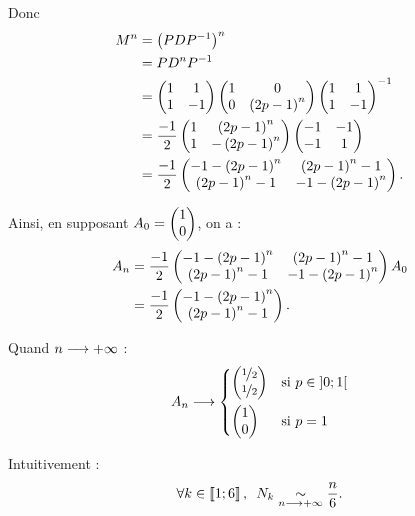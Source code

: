 \begin{corr}[Exercice 1, 2]
Donc \[\begin{aligned}
M^n&=\left(PDP^{-1}\right)^n \\
&=PD^nP^{-1} \\
&=\begin{pmatrix}
1 & 1 \\
1 & -1
\end{pmatrix}\begin{pmatrix}
1 & 0 \\
0 & \left(2p-1\right)^n
\end{pmatrix}\begin{pmatrix}
1 & 1 \\
1 & -1
\end{pmatrix}^{-1} \\
&=\dfrac{-1}{2}\begin{pmatrix}
1 & \left(2p-1\right)^n \\
1 & -\left(2p-1\right)^n
\end{pmatrix}\begin{pmatrix}
-1 & -1 \\
-1 & 1
\end{pmatrix} \\
&=\dfrac{-1}{2}\begin{pmatrix}
-1-\left(2p-1\right)^n & \left(2p-1\right)^n-1 \\
\left(2p-1\right)^n-1 & -1-\left(2p-1\right)^n
\end{pmatrix}.
\end{aligned}\]

Ainsi, en supposant \(A_0=\begin{pmatrix}1\\0\end{pmatrix}\), on a : \[\begin{aligned}
A_n&=\dfrac{-1}{2}\begin{pmatrix}
-1-\left(2p-1\right)^n & \left(2p-1\right)^n-1 \\
\left(2p-1\right)^n-1 & -1-\left(2p-1\right)^n
\end{pmatrix}A_0 \\
&=\dfrac{-1}{2}\begin{pmatrix}-1-\left(2p-1\right)^n\\\left(2p-1\right)^n-1\end{pmatrix}.
\end{aligned}\]

Quand \(n\longrightarrow+\infty\) : \[A_n\longrightarrow\begin{dcases}
\begin{pmatrix}\nicefrac{1}{2}\\\nicefrac{1}{2}\end{pmatrix} &\text{si }p\in\left]0;1\right[ \\
\begin{pmatrix}1\\0\end{pmatrix} &\text{si }p=1
\end{dcases}\]
\end{corr}

\begin{corr}[Exercice 2, 1]
Intuitivement : \[\quantifs{\forall k\in\interventierii{1}{6}}N_k\simqd{n\to\pinf}\dfrac{n}{6}.\]

\end{corr}

